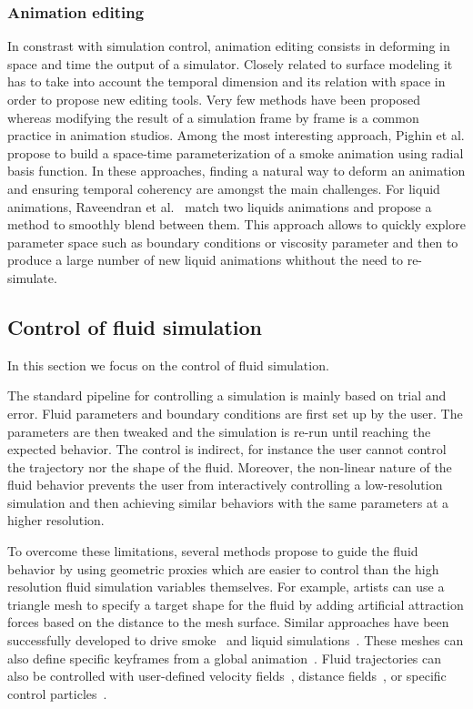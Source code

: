 \subsubsection{Animation editing} 
In constrast with simulation control, animation editing consists in deforming in space and time the output of a simulator. Closely related to surface modeling it has to take into account the temporal dimension and its relation with space in order to propose new editing tools. Very few methods have been proposed whereas modifying the result of a simulation frame by frame is a common practice in animation studios. Among the most interesting approach, Pighin et al.\cite{Pighin2004} propose to build a space-time parameterization of a smoke animation using radial basis function. In these approaches, finding a natural way to deform an animation and ensuring temporal coherency are amongst the main challenges. For liquid animations, Raveendran et al.~\cite{Raveendran2014} match two liquids animations and propose a method to smoothly blend between them. This approach allows to quickly explore parameter space such as boundary conditions or viscosity parameter and then to produce a large number of new liquid animations whithout the need to re-simulate.

\subsection{Control of fluid simulation}
\label{subsec:fluidControl}
In this section we focus on the control of fluid simulation.

The standard pipeline for controlling a simulation is mainly based on trial and error. Fluid parameters and boundary conditions are first set up by the user. The parameters are then tweaked and the simulation is re-run until reaching the expected behavior. The control is indirect, for instance the user cannot control the trajectory nor the shape of the fluid. Moreover, the non-linear nature of the fluid behavior prevents the user from interactively controlling a low-resolution simulation and then achieving similar behaviors with the same parameters at a higher resolution.

To overcome these limitations, several methods propose to guide the fluid behavior by using geometric proxies which are easier to control than the high resolution fluid simulation variables themselves.
For example, artists can use a triangle mesh to specify a target shape for the fluid by adding artificial attraction forces based on the distance to the mesh surface. Similar approaches have been successfully developed to drive smoke~\cite{Fattal2004,Hong2004,Shi2005a} and liquid simulations~\cite{Shi2005b,Raveendran2012}. These meshes can also define specific keyframes from a global animation~\cite{Treuille2003,McNamara2004}.
Fluid trajectories can also be controlled with user-defined velocity fields~\cite{Kim2006:SmokeControl}, distance fields~\cite{Yang2013}, or specific control particles~\cite{Thurey2006:FluidControl,Madill2013}. 

